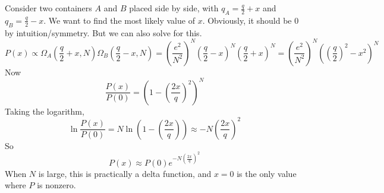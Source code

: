 \documentclass[12pt]{article}
\begin{document}
\begin{ex}
	Consider two containers $A$ and $B$ placed side by side, with $q_A = \frac{q}{2} + x$ and $q_B = \frac{q}{2} - x$. We want to find the most likely value of $x$. Obviously, it should be 0 by intuition/symmetry. But we can also solve for this.
	$$P(x) \propto \Omega_A\left(\frac{q}{2}+x,N\right)\Omega_B\left(\frac{q}{2}-x,N\right) = \left(\frac{e^2}{N^2}\right)^N\left(\frac{q}{2}-x\right)^N(\frac{q}{2}+x)^N = \left(\frac{e^2}{N^2}\right)^N\left(\left(\frac{q}{2}\right)^2-x^2\right)^N$$
	Now
	$$\frac{P(x)}{P(0)} = \left(1 - \left(\frac{2x}{q}\right)^2\right)^N$$
	Taking the logarithm,
	$$\ln\frac{P(x)}{P(0)} = N\ln\left(1-\left(\frac{2x}{q}\right)\right) \approx -N\left(\frac{2x}{q}\right)^2$$
	So
	$$P(x) \approx P(0) e^{-N\left(\frac{2x}{q}\right)^2}$$
	When $N$ is large, this is practically a delta function, and $x=0$ is the only value where $P$ is nonzero.
\end{ex}
\end{document}
